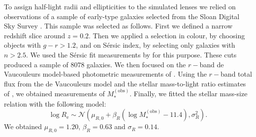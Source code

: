 \documentclass{aa}
\def\reff{R_{\mathrm{e}}}
\def\mobs{M_*^{(\mathrm{obs})}}
\begin{document}
To assign half-light radii and ellipticities to the simulated lenses we relied on observations of a sample of early-type galaxies selected from the Sloan Digital Sky Survey \citep[SDSS][]{Yor++00}.
This sample was selected as follows. First we defined a narrow redshift slice around $z=0.2$. Then we applied a selection in colour, by choosing objects with $g-r>1.2$, and on S\'{e}rsic index, by selecting only galaxies with $n>2.5$. We used the S\'{e}rsic fit measurements by \citet{Mee++15} for this purpose. These cuts produced a sample of $8078$ galaxies.
We then focused on the $r-$band de Vaucouleurs model-based photometric measurements of \citet{Mee++15}.
Using the $r-$band total flux from the de Vaucouleurs model and the stellar mass-to-light ratio estimates of \citet{Men++14}, we obtained measurements of $\mobs$. Finally, we fitted the stellar mass-size relation with the following model:
\begin{equation}
\log{\reff} \sim \mathcal{N}(\mu_{R,0} + \beta_R(\log{\mobs} - 11.4), \sigma_R^2).
\end{equation}
We obtained $\mu_{R,0}=1.20$, $\beta_R=0.63$ and $\sigma_R=0.14$.
\end{document}
